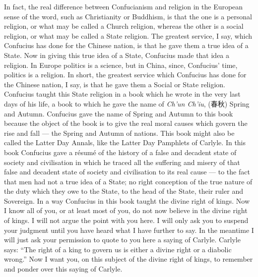 In fact, the real difference between Confucianism and religion in the European sense of the word, such as Christianity or Buddhism, is that the one is a personal religion, or what may be called a Church religion, whereas the other is a social religion, or what may be called a State religion.
The greatest service, I say, which Confucius has done for the Chinese nation, is that he gave them a true idea of a State.
Now in giving this true idea of a State, Confucius made that idea a religion.
In Europe politics is a science, but in China, since, Confucius' time, politics is a religion.
In short, the greatest service which Confucius has done for the Chinese nation, I say, is that he gave them a Social or State religion.
Confucius taught this State religion in a book which he wrote in the very last days of his life, a book to which he gave the name of \emph{Ch'un Ch'iu}, (春秋) Spring and Autumn.
Confucius gave the name of Spring and Autumn to this book because the object of the book is to give the real moral causes which govern the rise and fall --- the Spring and Autumn of nations.
This book might also be called the Latter Day Annals, like the Latter Day Pamphlets of Carlyle.
In this book Confucius gave a r\'esum\'e of the history of a false and decadent state of society and civilisation in which he traced all the suffering and misery of that false and decadent state of society and civilisation to its real cause --- to the fact that men had not a true idea of a State; no right conception of the true nature of the duty which they owe to the State, to the head of the State, their ruler and Sovereign.
In a way Confucius in this book taught the divine right of kings.
Now I know all of you, or at least most of you, do not now believe in the divine right of kings.
I will not argue the point with you here.
I will only ask you to suspend your judgment until you have heard what I have further to say.
In the meantime I will just ask your permission to quote to you here a saying of Carlyle.
Carlyle says: ``The right of a king to govern us is either a divine right or a diabolic wrong.''
Now I want you, on this subject of the divine right of kings, to remember and ponder over this saying of Carlyle.

